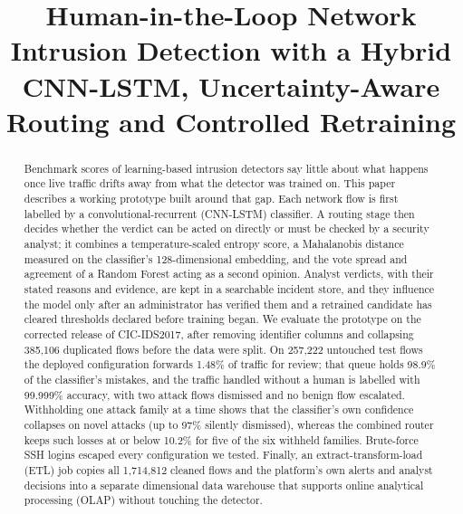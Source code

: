 \documentclass[conference]{IEEEtran}
\begin{document}
\title{Human-in-the-Loop Network Intrusion Detection with a Hybrid CNN-LSTM, Uncertainty-Aware Routing and Controlled Retraining}

\author{
\and
{}
}

\maketitle

\begin{abstract}
Benchmark scores of learning-based intrusion detectors say little about what happens once live
traffic drifts away from what the detector was trained on. This paper describes a working
prototype built around that gap. Each network flow is first labelled by a convolutional-recurrent
(CNN-LSTM) classifier. A routing stage then decides whether the verdict can be acted on directly
or must be checked by a security analyst; it combines a temperature-scaled entropy score, a
Mahalanobis distance measured on the classifier's 128-dimensional embedding, and the vote spread
and agreement of a Random Forest acting as a second opinion. Analyst verdicts, with their stated
reasons and evidence, are kept in a searchable incident store, and they influence the model only
after an administrator has verified them and a retrained candidate has cleared thresholds declared
before training began. We evaluate the prototype on the corrected release of CIC-IDS2017, after
removing identifier columns and collapsing 385,106 duplicated flows before the data were split.
On 257,222 untouched test flows the deployed configuration forwards 1.48\% of traffic for review;
that queue holds 98.9\% of the classifier's mistakes, and the traffic handled without a human is
labelled with 99.999\% accuracy, with two attack flows dismissed and no benign flow escalated.
Withholding one attack family at a time shows that the classifier's own confidence collapses on
novel attacks (up to 97\% silently dismissed), whereas the combined router keeps such losses at
or below 10.2\% for five of the six withheld families. Brute-force SSH logins escaped every
configuration we tested. Finally, an extract-transform-load (ETL) job copies all 1,714,812
cleaned flows and the platform's own alerts and analyst decisions into a separate dimensional
data warehouse that supports online analytical processing (OLAP) without touching the detector.
\end{abstract}
\end{document}
